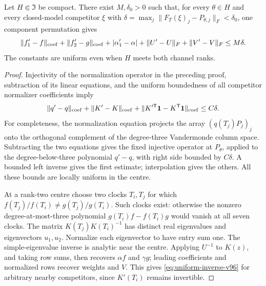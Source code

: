 \begin{lemma}
\label{lem:uniform-inverse-v96}
Let $H\Subset\mathfrak I$ be compact. There exist $M,\delta_0>0$
such that, for every $\theta\in H$ and every closed-model competitor
$\xi$ with $\delta=\max_j\|F_T(\xi)_j-P_{\theta,j}\|_F<\delta_0$,
one component permutation gives
\begin{equation}\label{eq:uniform-inverse-v96}
 \|f'_1-f\|_{\rm coef}+\|f'_2-g\|_{\rm coef}
 +|\alpha'_1-\alpha|+\|U'-U\|_F+\|V'-V\|_F\le M\delta.
\end{equation}
The constants are uniform even when $H$ meets both channel ranks.
\end{lemma}
\begin{proof}
Injectivity of the normalization operator in the preceding proof,
subtraction of its linear equations, and the uniform boundedness of
all competitor normalizer coefficients imply
\[
 \|q'-q\|_{\rm coef}+\|K'-K\|_{\rm coef}
       +\|K'^{\mathsf T}\mathbf 1-K^{\mathsf T}\mathbf 1\|_{\rm coef}\le C\delta.
\]
For completeness, the normalization equation projects the array
$(q(T_j)P_j)_j$ onto the orthogonal complement of the degree-three
Vandermonde column space. Subtracting the two equations gives the
fixed injective operator at $P_\theta$, applied to the degree-below-three
polynomial $q'-q$, with right side bounded by $C\delta$. A bounded
left inverse gives the first estimate; interpolation gives the others.
All these bounds are locally uniform in the centre.

At a rank-two centre choose two clocks $T_i,T_j$ for which
$f(T_j)/f(T_i)\ne g(T_j)/g(T_i)$. Such clocks exist: otherwise the
nonzero degree-at-most-three polynomial $g(T_i)f-f(T_i)g$ would
vanish at all seven clocks. The matrix $K(T_j)K(T_i)^{-1}$ has distinct
real eigenvalues and eigenvectors $u_1,u_2$. Normalize each eigenvector
to have entry sum one. The simple-eigenvalue inverse is analytic near
the centre. Applying $U^{-1}$ to $K(z)$, and taking row sums, then
recovers $\alpha f$ and $\gamma g$; leading coefficients and normalized
rows recover weights and $V$. This gives \eqref{eq:uniform-inverse-v96}
for arbitrary nearby competitors, since $K'(T_i)$ remains invertible.


\end{proof}
